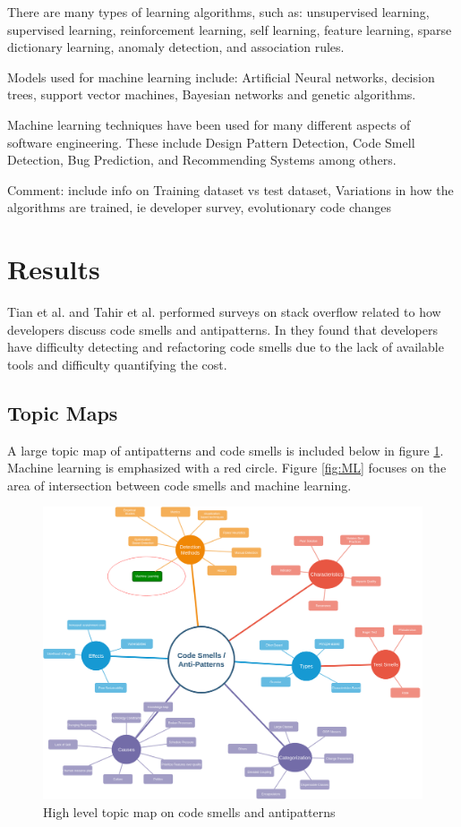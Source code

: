 \documentclass[conference]{IEEEtran}
\begin{document}
There are many types of learning algorithms, such as: unsupervised learning, supervised learning, reinforcement learning, self learning, feature learning, sparse dictionary learning, anomaly detection, and association rules.

Models used for machine learning include: Artificial Neural networks, decision trees, support vector machines, Bayesian networks and genetic algorithms.

Machine learning techniques have been used for many different aspects of software engineering\cite{fontana_code_2017}. These include Design Pattern Detection, Code Smell Detection, Bug Prediction, and Recommending Systems among others.

Comment: include info on Training dataset vs test dataset, Variations in how the algorithms are trained, ie developer survey, evolutionary code changes

\section{Results}
Tian et al.\cite{tian_how_2019} and Tahir et al.\cite{tahir_can_2018} performed surveys on stack overflow related to how developers discuss code smells and antipatterns. In \cite{tian_how_2019} they found that developers have difficulty detecting and refactoring code smells due to the lack of available tools and difficulty quantifying the cost.

\subsection{Topic Maps}

A large topic map of antipatterns and code smells is included below in figure \ref{fig:TM}.
Machine learning is emphasized with a red circle. 
Figure \ref{fig:ML} focuses on the area of intersection between code smells and machine learning.
\begin{figure}[ht]
  \centerline{\includegraphics[width=\linewidth]{AntiPattern-TopicMap.png}}
  \caption{High level topic map on code smells and antipatterns}
  \label{fig:TM}
\end{figure} 
\end{document}
